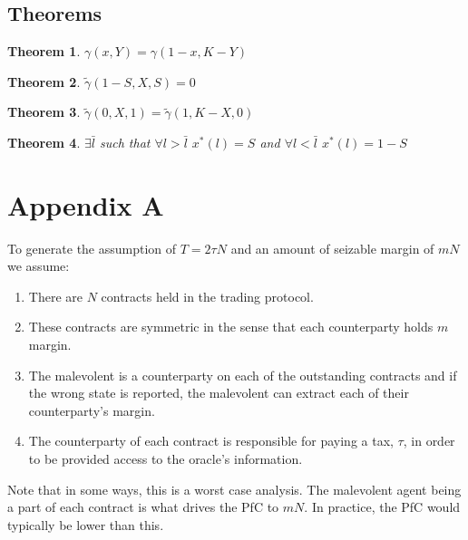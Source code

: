 \documentclass[12pt]{article}
\newtheorem{thm}{Theorem}
\begin{document}
  \subsection{Theorems}

    \begin{thm}
      $\gamma(x, Y) = \gamma(1 - x, K - Y)$
    \end{thm}

    \begin{thm}
      $\tilde{\gamma}(1 - S, X, S) = 0$
    \end{thm}

    \begin{thm}
      $\tilde{\gamma}(0, X, 1) = \tilde{\gamma}(1, K-X, 0)$
    \end{thm}

    \begin{thm}
      $\exists \bar{l}$ such that $\forall l > \bar{l}$ $x^*(l) = S$ and $\forall l < \bar{l}$ $x^*(l) = 1-S$
    \end{thm}

\section{Appendix A}

  To generate the assumption of $T = 2 \tau N$ and an amount of seizable margin of $mN$ we assume:

  \begin{enumerate}
    \item There are $N$ contracts held in the trading protocol.
    \item These contracts are symmetric in the sense that each counterparty holds $m$ margin.
    \item The malevolent is a counterparty on each of the outstanding contracts and if the wrong
    state is reported, the malevolent can extract each of their counterparty's margin.
    \item The counterparty of each contract is responsible for paying a tax, $\tau$, in order to
    be provided access to the oracle's information.
  \end{enumerate}

  Note that in some ways, this is a worst case analysis. The malevolent agent being a part of each
  contract is what drives the PfC to $mN$. In practice, the PfC would typically be lower than this.
\end{document}

